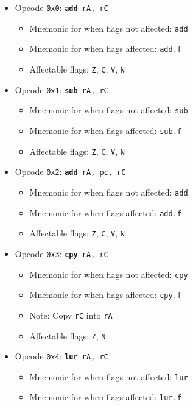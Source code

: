 \documentclass{article}
\begin{document}
	\singlespacing
	\begin{itemize}
		\item Opcode \texttt{0x0}:
			\texttt{\textbf{add} rA, rC}
		\begin{itemize}
			\item Mnemonic for when flags not affected:  \texttt{add}
			\item Mnemonic for when flags affected:  \texttt{add.f}
			\item Affectable flags:
				\texttt{Z}, \texttt{C}, \texttt{V}, \texttt{N}
		\end{itemize}
		\item Opcode \texttt{0x1}:
			\texttt{\textbf{sub} rA, rC}
		\begin{itemize}
			\item Mnemonic for when flags not affected:  \texttt{sub}
			\item Mnemonic for when flags affected:  \texttt{sub.f}
			\item Affectable flags:
				\texttt{Z}, \texttt{C}, \texttt{V}, \texttt{N}
		\end{itemize}
		\item Opcode \texttt{0x2}:
			\texttt{\textbf{add} rA, pc, rC}
		\begin{itemize}
			\item Mnemonic for when flags not affected:  \texttt{add}
			\item Mnemonic for when flags affected:  \texttt{add.f}
			\item Affectable flags:
				\texttt{Z}, \texttt{C}, \texttt{V}, \texttt{N}
		\end{itemize}
		\item Opcode \texttt{0x3}:
			\texttt{\textbf{cpy} rA, rC}
		\begin{itemize}
			\item Mnemonic for when flags not affected:  \texttt{cpy}
			\item Mnemonic for when flags affected:  \texttt{cpy.f}
			\item Note:  Copy \texttt{rC} into \texttt{rA}
			\item Affectable flags:
				\texttt{Z}, \texttt{N}
		\end{itemize}
		\item Opcode \texttt{0x4}:
			\texttt{\textbf{lur} rA, rC}
		\begin{itemize}
			\item Mnemonic for when flags not affected:  \texttt{lur}
			\item Mnemonic for when flags affected:  \texttt{lur.f}

\end{itemize}
\end{itemize}
\end{document}

